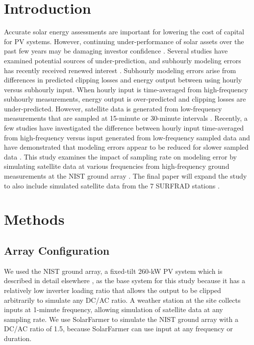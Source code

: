 \documentclass[conference]{IEEEtran}
\begin{document}
\section{Introduction}
Accurate solar energy assessments are important for lowering the cost of capital for PV systems. However, continuing under-performance of solar assets over the past few years may be damaging investor confidence \cite{Matsui2021}. Several studies have examined potential sources of under-prediction, and subhourly modeling errors has recently received renewed interest \cite{Parikh2021,Anderson2020,Bradford2020,Kharait2020,Cormode2019}. Subhourly modeling errors arise from differences in predicted clipping losses and energy output between using hourly versus subhourly input. When hourly input is time-averaged from high-frequency subhourly measurements, energy output is over-predicted and clipping losses are under-predicted. However, satellite data is generated from low-frequency measurements that are sampled at 15-minute or 30-minute intervals \cite{Wilcox2012,Sengupta2018}. Recently, a few studies have investigated the difference between hourly input time-averaged from high-frequency versus input generated from low-frequency sampled data and have demonstrated that modeling errors appear to be reduced for slower sampled data \cite{Bowersox2021}. This study examines the impact of sampling rate on modeling error by simulating satellite data at various frequencies from high-frequency ground measurements at the NIST ground array \cite{Boyd2017,Boyd2017a,Boyd2017b}. The final paper will expand the study to also include simulated satellite data from the 7 SURFRAD stations \cite{Augustine2000}.

\section{Methods}

\subsection{Array Configuration}
We used the NIST ground array, a fixed-tilt 260-kW PV system which is described in detail elsewhere \cite{Boyd2017,Boyd2017a,Boyd2017b}, as the base system for this study because it has a relatively low inverter loading ratio that allows the output to be clipped arbitrarily to simulate any DC/AC ratio. A weather station at the site collects inputs at 1-minute frequency, allowing simulation of satellite data at any sampling rate. We use SolarFarmer \cite{solarfarmer2018} to simulate the NIST ground array with a DC/AC ratio of 1.5, because SolarFarmer can use input at any frequency or duration.
\end{document}

